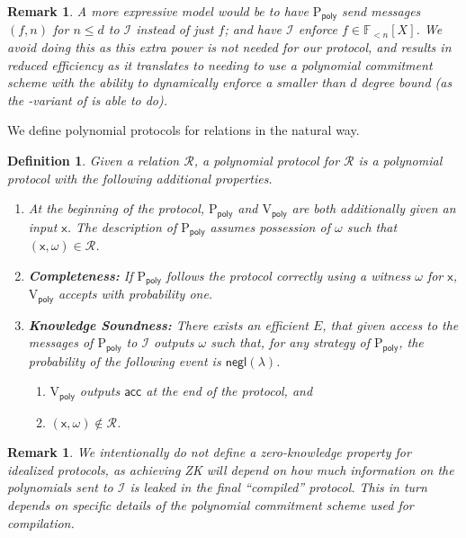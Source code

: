 \documentclass[11pt]{article} %
\newcommand{\F}{\ensuremath{\mathbb F}\xspace}
\newcommand{\negl}{\ensuremath{\mathsf{negl}(\lambda)}\xspace}
\newcommand{\acc}{\ensuremath{\mathsf{acc}}\xspace}
\newcommand{\prvpoly}{\ensuremath{\mathrm{P_{\mathsf{poly}}}}\xspace}
\newcommand{\verpoly}{\ensuremath{\mathrm{V_{\mathsf{poly}}}}\xspace}
\newcommand{\ideal}{\ensuremath{\mathcal{I}}\xspace}
\newcommand{\inp}{\ensuremath{\mathsf{x}}\xspace}
\newcommand{\wit}{\ensuremath{\omega}\xspace}
\newcommand{\rel}{\ensuremath{\mathcal{R}}\xspace}
\newcommand{\ext}{\ensuremath{E}\xspace}
\newcommand{\polysofdeg}[1]{\ensuremath{\F_{< #1}[X]}\xspace}
\newtheorem{dfn}[lemma]{Definition}
\newtheorem{remark}[lemma]{Remark}
\begin{document}
\begin{remark}
A more expressive model would be to have \prvpoly send messages $(f,n)$ for $n\leq d$ to \ideal instead of just $f$; and have \ideal enforce $f\in \polysofdeg{n}$. 
We avoid doing this as this extra power is not needed for our protocol, and results in reduced efficiency as it translates to needing to use a polynomial commitment scheme with the ability to dynamically enforce a smaller than $d$ degree bound (as the \cite{sonic}-variant of \cite{kate} is able to do).

\end{remark}




We define polynomial protocols for relations in the natural way.
\begin{dfn}\label{dfn:protforrel}
Given a relation \rel, a \emph{polynomial protocol for \rel} is a polynomial protocol with the following additional properties.
\begin{enumerate}
 \item At the beginning of the protocol, \prvpoly and \verpoly are both additionally given an input \inp. The description of \prvpoly assumes possession of \wit such that $(\inp,\wit)\in \rel$.
 \item \textbf{Completeness:} If \prvpoly follows the protocol correctly using a witness \wit for \inp, \verpoly accepts with probability one.
 \item \textbf{Knowledge Soundness:} There exists an efficient \ext, that given access to the messages of \prvpoly to \ideal outputs \wit such that, for any strategy of \prvpoly, the probability of the following event is \negl.
 \begin{enumerate}
  \item \verpoly outputs \acc at the end of the protocol, and
  \item $(\inp,\wit)\notin \rel$.
 \end{enumerate}

\end{enumerate}
\end{dfn}
\begin{remark}
We intentionally do not define a zero-knowledge property for idealized protocols, as achieving ZK will depend on how much information on the polynomials sent to \ideal is leaked in the final ``compiled'' protocol. This in turn depends on specific details of the polynomial commitment scheme used for compilation.
\end{remark}
\end{document}
